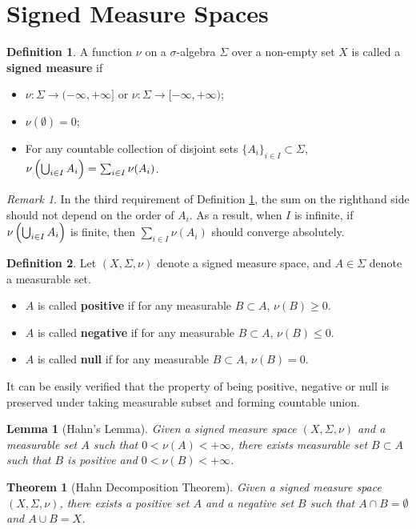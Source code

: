 \documentclass[openany]{book}
\newtheorem{lemma}{Lemma}[chapter]
\newtheorem{theorem}{Theorem}[chapter]
\theoremstyle{definition}
\newtheorem{definition}{Definition}[chapter]
\theoremstyle{remark}
\newtheorem*{remark}{Remark}
\begin{document}
\section{Signed Measure Spaces}
\begin{definition}\label{def:signedMeasure}
    A function $\nu$ on a $\sigma$-algebra $\Sigma$ over a non-empty set $X$ is called a \textbf{signed measure} if
    \begin{itemize}
        \item $\nu:\Sigma\to(-\infty,+\infty]$ or $\nu:\Sigma\to[-\infty,+\infty)$;
        \item $\nu(\emptyset)=0$;
        \item For any countable collection of disjoint sets $\{A_i\}_{i\in I}\subset\Sigma$, $\nu\del{\bigcup_{i\in I}A_i}=\sum_{i\in I}\nu(A_i)$.
    \end{itemize}
\end{definition}
\begin{remark}
    In the third requirement of Definition \ref{def:signedMeasure}, the sum on the righthand side should not depend on the order of $A_i$. As a result, when $I$ is infinite, if $\nu\del{\bigcup_{i\in I}A_i}$ is finite, then $\sum_{i\in I}\nu(A_i)$ should converge absolutely.
\end{remark}
\begin{definition}
    Let $(X,\Sigma,\nu)$ denote a signed measure space, and $A\in\Sigma$ denote a measurable set.
    \begin{itemize}
        \item $A$ is called \textbf{positive} if for any measurable $B\subset A$, $\nu(B)\ge0$.
        \item $A$ is called \textbf{negative} if for any measurable $B\subset A$, $\nu(B)\le0$.
        \item $A$ is called \textbf{null} if for any measurable $B\subset A$, $\nu(B)=0$.
    \end{itemize}
\end{definition}
It can be easily verified that the property of being positive, negative or null is preserved under taking measurable subset and forming countable union.
\begin{lemma}[Hahn's Lemma]
    Given a signed measure space $(X,\Sigma,\nu)$ and a measurable set $A$ such that $0<\nu(A)<+\infty$, there exists measurable set $B\subset A$ such that $B$ is positive and $0<\nu(B)<+\infty$.
\end{lemma}
\begin{theorem}[Hahn Decomposition Theorem]
    Given a signed measure space $(X,\Sigma,\nu)$, there exists a positive set $A$ and a negative set $B$ such that $A\cap B=\emptyset$ and $A\cup B=X$.
\end{theorem}
\end{document}
